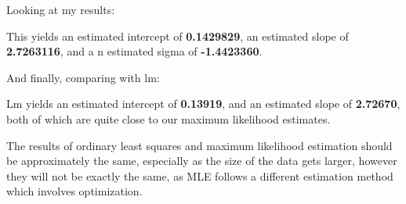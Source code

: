 \documentclass[12pt,letterpaper]{article}
\begin{document}
\noindent Looking at my results: 

\vspace{.1in}

\vspace{.1in}

\noindent This yields an estimated intercept of \textbf{0.1429829}, an estimated slope of \textbf{2.7263116}, and a n estimated sigma of \textbf{-1.4423360}. 

\noindent And finally, comparing with lm: 

\vspace{.1in}

\vspace{.1in}

\noindent Lm yields an estimated intercept of \textbf{0.13919}, and an estimated slope of \textbf{2.72670}, both of which are quite close to our maximum likelihood estimates. 

\noindent The results of ordinary least squares and maximum likelihood estimation should be approximately the same, especially as the size of the data gets larger, however they will not be exactly the same, as MLE follows a different estimation method which involves optimization. 
\end{document}
